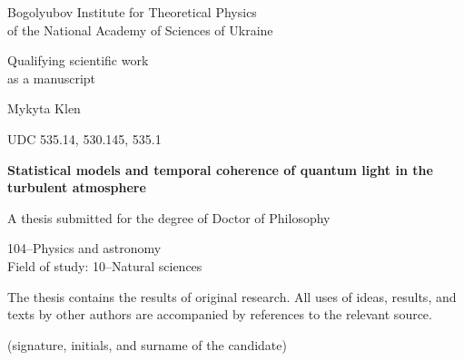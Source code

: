 


\begin{titlepage}
    \centering

    Bogolyubov Institute for Theoretical Physics \\
    of the National Academy of Sciences of Ukraine

    \vspace{1.5cm}
    \begin{flushright}
        \small
        Qualifying scientific work\\
        as a manuscript
    \end{flushright}

    {\large Mykyta Klen}
    \vspace{0.5cm}

    \begin{flushright}
        UDC 535.14, 530.145, 535.1
    \end{flushright}

    \vfill

        \vspace{0.5cm}
    {\fontsize{18.6pt}{18pt}\selectfont \textbf{Statistical models and temporal coherence of quantum light in the turbulent atmosphere}\par}

    \vfill

    \begin{center}
        A thesis submitted for the degree of Doctor of Philosophy
    \end{center}

    \begin{center}
        \small
        104--Physics and astronomy\\
        Field of study: 10--Natural sciences
    \end{center}

    \begin{flushleft}
        \small
        The thesis contains the results of original research. All uses of ideas, results, and texts by other authors are accompanied by references to the relevant source.\\[1cm]
        \underline{\hspace{3in}} \par\footnotesize (signature, initials, and surname of the candidate)
    \end{flushleft}


\end{titlepage}
